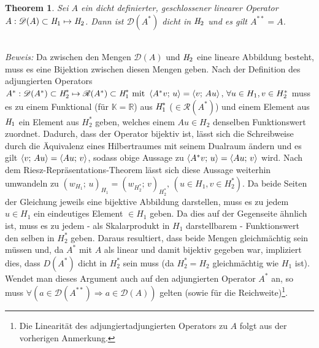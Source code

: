 \documentclass[size=12pt]{report}
\newtheorem{theoremvar}{Theorem}
\begin{document}
\begin{theoremvar}
Sei $A$ ein dicht definierter, geschlossener linearer Operator $A:\mathscr{D}(A)\subset \emph{H}_1 \mapsto \emph{H}_2$. Dann ist $\mathscr{D}(A^*)$ dicht in $\emph{H}_2$ und es gilt $A^{**}=A$.
\end{theoremvar}
\\
\emph{Beweis:}
Da zwischen den Mengen $\mathscr{D}(A)$ und $\emph{H}_2$ eine lineare Abbildung besteht, muss es eine Bijektion zwischen diesen Mengen geben. Nach der Definition des adjungierten Operators $A^*:\mathscr{D}(A^*)\subset \emph{H}^*_2 \mapsto \mathscr{R}(A^*) \subset \emph{H}^*_1 \text{ mit } \braket{A^*v;\, u} = \braket{v;\, Au},\, \forall u\in H_1, v\in H_2^*$ muss es zu einem Funktional (für $\mathbb{K}=\mathbb{R}$) aus $\emph{H}_1^*$ ($\in \mathscr{R}(A^*)$) und einem Element aus $\emph{H}_1$ ein Element aus $H_2^*$ geben, welches einem $Au \in H_2$ denselben Funktionswert zuordnet.
Dadurch, dass der Operator bijektiv ist, lässt sich die Schreibweise durch die Äquivalenz eines Hilbertraumes mit seinem Dualraum ändern und es gilt $\braket{v;\, Au}=\braket{Au;\, v}$, sodass obige Aussage zu $\braket{A^*v;\, u}=\braket{Au;\, v}$ wird. Nach dem Riesz-Repräsentations-Theorem lässt sich diese Aussage weiterhin umwandeln zu $(w_{H_1};\, u)_{H_1}=(w_{H^*_2};\, v)_{H^*_2},\, (u\in H_1, v\in H_2^*)$. Da beide Seiten der Gleichung jeweils eine bijektive Abbildung darstellen, muss es zu jedem $u\in H_1$ ein eindeutiges Element $\in H_1$ geben. Da dies auf der Gegenseite ähnlich ist, muss es zu jedem - als Skalarprodukt in $H_1$ darstellbarem - Funktionswert den selben in $H_2^*$ geben. Daraus resultiert, dass beide Mengen gleichmächtig sein müssen und, da $A^*$ mit $A$ als linear und damit bijektiv gegeben war, impliziert dies, dass $D(A^*)$ dicht in $H_2^*$ sein muss (da $H_2^*=H_2$ gleichmächtig wie $H_1$ ist).
Wendet man dieses Argument auch auf den adjungierten Operator $A^*$ an, so muss $\forall (a\in \mathscr{D}(A^{**})\Rightarrow a\in \mathscr{D}(A))$ gelten (sowie für die Reichweite)\footnote{Die Linearität des adjungiertadjungierten Operators zu $A$ folgt aus der vorherigen Anmerkung.}.
\end{document}
